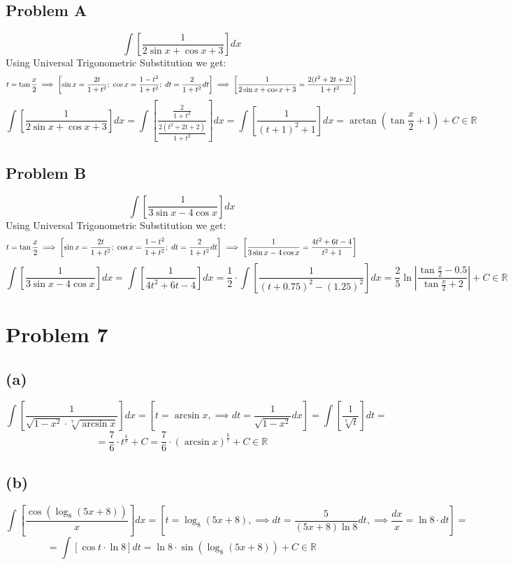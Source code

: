 \documentclass{article}
\begin{document}
\subsection*{Problem A}
$$\int\left[\frac{1}{2\sin{x} + \cos{x} + 3}\right]dx$$
Using Universal Trigonometric Substitution we get:
$$t = \tan{\frac{x}{2}}\implies\left[\sin{x} = \frac{2t}{1 + t^2};\hspace{0.1cm}\cos{x} = \frac{1 - t^2}{1 + t^2};\hspace{0.1cm}dt = \frac{2}{1 + t^2}dt\right]\implies\left[\frac{1}{2\sin{x} + \cos{x} + 3} = \frac{2(t^2 + 2t + 2)}{1 + t^2}\right]$$
$$\int\left[\frac{1}{2\sin{x} + \cos{x} + 3}\right]dx = \int\left[\frac{\frac{2}{1 + t^2}}{\frac{2(t^2 + 2t + 2)}{1 + t^2}}\right]dx = \int\left[\frac{1}{(t + 1)^2 + 1}\right]dx = \arctan{(\tan{\frac{x}{2}} + 1)} + C\in\mathbb{R}$$
\subsection*{Problem B}
$$\int\left[\frac{1}{3\sin{x} - 4\cos{x}}\right]dx$$
Using Universal Trigonometric Substitution we get:
$$t = \tan{\frac{x}{2}}\implies\left[\sin{x} = \frac{2t}{1 + t^2};\hspace{0.1cm}\cos{x} = \frac{1 - t^2}{1 + t^2};\hspace{0.1cm}dt = \frac{2}{1 + t^2}dt\right]\implies\left[\frac{1}{3\sin{x} - 4\cos{x}} = \frac{4t^2 + 6t - 4}{t^2 + 1}\right]$$
$$\int\left[\frac{1}{3\sin{x} - 4\cos{x}}\right]dx = \int\left[\frac{1}{4t^2 + 6t - 4}\right]dx = \frac{1}{2}\cdot\int\left[\frac{1}{(t + 0.75)^2 - (1.25)^2}\right]dx = \frac{2}{5}\ln{\left|\frac{\tan{\frac{x}{2}} - 0.5 }{ \tan{\frac{x}{2}} + 2 }\right|} + C\in\mathbb{R}$$
\newpage\section*{Problem 7}
\subsection*{(a)}
$$\int\left[\frac{1}{\sqrt{1 - x^2}\cdot\sqrt[7]{\arcsin{x}}}\right]dx = \left[t = \arcsin{x},\implies dt = \frac{1}{\sqrt{1 - x^2}}dx\right] = \int\left[\frac{1}{\sqrt[7]{t}}\right]dt = $$
$$ = \frac{7}{6}\cdot t^{\frac{6}{7}} + C = \frac{7}{6}\cdot (\arcsin{x})^{\frac{6}{7}} + C\in\mathbb{R}$$
\subsection*{(b)}
$$\int\left[\frac{\cos{(\log_8{(5x + 8)})}}{x}\right]dx = \left[t = \log_8{(5x + 8)},\implies dt = \frac{5}{(5x + 8)\ln{8}}dt,\implies \frac{dx}{x} = \ln{8}\cdot dt\right] = $$
$$ = \int\left[\cos{t}\cdot\ln{8}\right] dt = \ln{8}\cdot\sin{(\log_8{(5x + 8)})} + C\in\mathbb{R}$$
\end{document}
